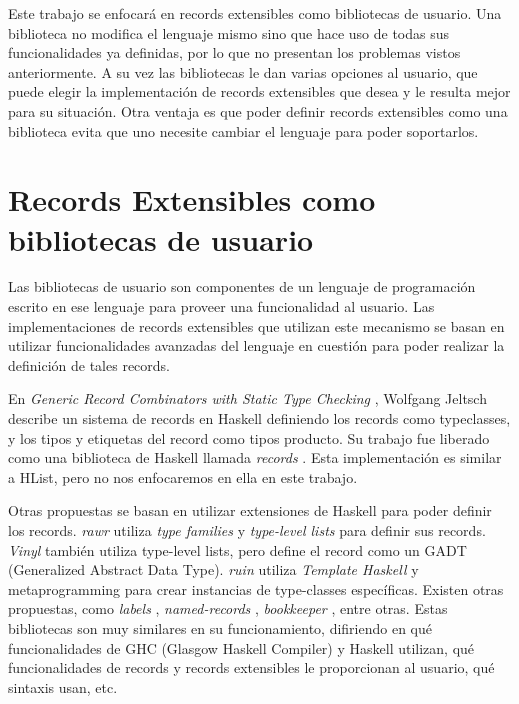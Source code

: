 Este trabajo se enfocará en records extensibles como bibliotecas de usuario. Una biblioteca no modifica el lenguaje mismo sino que hace uso de todas sus funcionalidades ya definidas, por lo que no presentan los problemas vistos anteriormente. A su vez las bibliotecas le dan varias opciones al usuario, que puede elegir la implementación de records extensibles que desea y le resulta mejor para su situación. Otra ventaja es que poder definir records extensibles como una biblioteca evita que uno necesite cambiar el lenguaje para poder soportarlos.

\section{Records Extensibles como bibliotecas de usuario}

Las bibliotecas de usuario son componentes de un lenguaje de programación escrito en ese lenguaje para proveer una funcionalidad al usuario. Las implementaciones de records extensibles que utilizan este mecanismo se basan en utilizar funcionalidades avanzadas del lenguaje en cuestión para poder realizar la definición de tales records.

En \textit{Generic Record Combinators with Static Type Checking} \cite{Jeltsch:2010:GRC:1836089.1836108}, Wolfgang Jeltsch describe un sistema de records en Haskell definiendo los records como typeclasses, y los tipos y etiquetas del record como tipos producto. Su trabajo fue liberado como una biblioteca de Haskell llamada \textit{records} \cite{Haskell:Records}. Esta implementación es similar a HList, pero no nos enfocaremos en ella en este trabajo.

Otras propuestas se basan en utilizar extensiones de Haskell para poder definir los records. \textit{rawr} \cite{Haskell:Rawr} utiliza \textit{type families} y \textit{type-level lists} para definir sus records. \textit{Vinyl} \cite{Haskell:Vinyl} también utiliza type-level lists, pero define el record como un GADT (Generalized Abstract Data Type). \textit{ruin} \cite{Haskell:Ruin} utiliza \textit{Template Haskell} y metaprogramming para crear instancias de type-classes específicas. Existen otras propuestas, como \textit{labels} \cite{Haskell:Labels}, \textit{named-records} \cite{Haskell:NamedRecords}, \textit{bookkeeper} \cite{Haskell:Bookkeeper}, entre otras. Estas bibliotecas son muy similares en su funcionamiento, difiriendo en qué funcionalidades de GHC (Glasgow Haskell Compiler) y Haskell utilizan, qué funcionalidades de records y records extensibles le proporcionan al usuario, qué sintaxis usan, etc.

